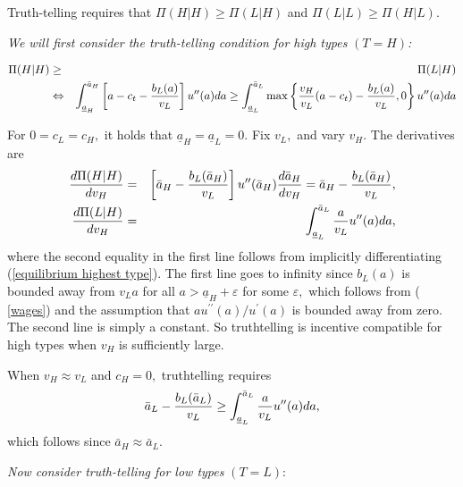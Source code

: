 \documentclass[12pt]{article}
\theoremstyle{plain}
\begin{document}
Truth-telling requires that $\Pi (H|H)\geq \Pi (L|H)$ and $\Pi (L|L)\geq \Pi
(H|L).$

\textit{We will first consider the truth-telling condition for high types }$%
(T=H)$\textit{:}

\begin{eqnarray}
\Pi (H|H) &\geq &\Pi (L|H)  \label{truth1} \\
&\Leftrightarrow &\int_{\underline{a}_{H}}^{\bar{a}_{H}}\left[ a-c_{t}-\frac{%
b_{L}(a)}{v_{L}}\right] u^{\prime \prime }(a)da\geq \int_{\underline{a}%
_{L}}^{\bar{a}_{L}}\max \left\{ \frac{v_{H}}{v_{L}}(a-c_{t})-\frac{b_{L}(a)}{%
v_{L}},0\right\} u^{\prime \prime }(a)da  \label{truth2}
\end{eqnarray}

For $0=c_{L}=c_{H},$ it holds that $\underline{a}_{H}=\underline{a}_{L}=0.$
Fix $v_{L},$ and vary $v_{H}.$ The derivatives are%
\begin{eqnarray}
\frac{d\Pi (H|H)}{dv_{H}} &=&\left[ \bar{a}_{H}-\frac{b_{L}(\bar{a}_{H})}{%
v_{L}}\right] u^{\prime \prime }(\bar{a}_{H})\frac{d\bar{a}_{H}}{dv_{H}}=%
\bar{a}_{H}-\frac{b_{L}(\bar{a}_{H})}{v_{L}},  \label{truth3} \\
\frac{d\Pi (L|H)}{dv_{H}} &=&\int_{\underline{a}_{L}}^{\bar{a}_{L}}\frac{a}{%
v_{L}}u^{\prime \prime }(a)da,  \label{truth4}
\end{eqnarray}%
where the second equality in the first line follows from implicitly
differentiating (\ref{equilibrium highest type}). The first line goes to
infinity since $b_{L}(a)$ is bounded away from $v_{L}a$ for all $a>%
\underline{a}_{H}+\varepsilon $ for some $\varepsilon ,$ which follows from (%
\ref{wages}) and the assumption that $au^{\prime \prime }(a)/u^{\prime }(a)$
is bounded away from zero. The second line is simply a constant. So
truthtelling is incentive compatible for high types when $v_{H}$ is
sufficiently large.

When $v_{H}\approx v_{L}$ and $c_{H}=0,$ truthtelling requires 
\begin{equation}
\bar{a}_{L}-\frac{b_{L}(\bar{a}_{L})}{v_{L}}\geq \int_{\underline{a}_{L}}^{%
\bar{a}_{L}}\frac{a}{v_{L}}u^{\prime \prime }(a)da,  \label{truth-local}
\end{equation}%
which follows since $\bar{a}_{H}\approx \bar{a}_{L}.$

\textit{Now consider truth-telling for low types }$(T=L):$
\end{document}

